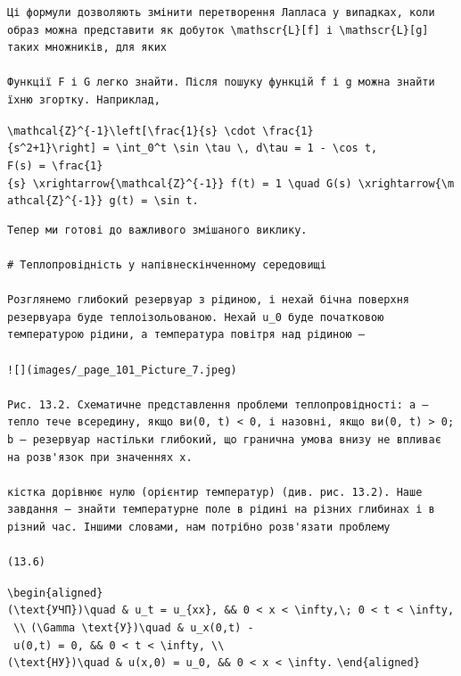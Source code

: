 \documentclass[
  ukrainian,
]{article}
\begin{document}
\begin{verbatim}
Ці формули дозволяють змінити перетворення Лапласа у випадках, коли образ можна представити як добуток \mathscr{L}[f] і \mathscr{L}[g] таких множників, для яких

Функції F і G легко знайти. Після пошуку функцій f і g можна знайти їхню згортку. Наприклад,
\end{verbatim}

\texttt{\textbackslash{}mathcal\{Z\}\^{}\{-1\}\textbackslash{}left{[}\textbackslash{}frac\{1\}\{s\}\ \textbackslash{}cdot\ \textbackslash{}frac\{1\}\{s\^{}2+1\}\textbackslash{}right{]}\ =\ \textbackslash{}int\_0\^{}t\ \textbackslash{}sin\ \textbackslash{}tau\ \textbackslash{},\ d\textbackslash{}tau\ =\ 1\ -\ \textbackslash{}cos\ t,}
\texttt{F(s)\ =\ \textbackslash{}frac\{1\}\{s\}\ \textbackslash{}xrightarrow\{\textbackslash{}mathcal\{Z\}\^{}\{-1\}\}\ f(t)\ =\ 1\ \textbackslash{}quad\ G(s)\ \textbackslash{}xrightarrow\{\textbackslash{}mathcal\{Z\}\^{}\{-1\}\}\ g(t)\ =\ \textbackslash{}sin\ t.}

\begin{verbatim}
Тепер ми готові до важливого змішаного виклику.

# Теплопровідність у напівнескінченному середовищі

Розглянемо глибокий резервуар з рідиною, і нехай бічна поверхня резервуара буде теплоізольованою. Нехай u_0 буде початковою температурою рідини, а температура повітря над рідиною —

![](images/_page_101_Picture_7.jpeg)

Рис. 13.2. Схематичне представлення проблеми теплопровідності: a — тепло тече всередину, якщо ви(0, t) < 0, і назовні, якщо ви(0, t) > 0; b — резервуар настільки глибокий, що гранична умова внизу не впливає на розв'язок при значеннях x.

кістка дорівнює нулю (орієнтир температур) (див. рис. 13.2). Наше завдання — знайти температурне поле в рідині на різних глибинах і в різний час. Іншими словами, нам потрібно розв'язати проблему

(13.6)
\end{verbatim}

\texttt{\textbackslash{}begin\{aligned\}}
\texttt{(\textbackslash{}text\{УЧП\})\textbackslash{}quad\ \&\ u\_t\ =\ u\_\{xx\},\ \&\&\ 0\ \textless{}\ x\ \textless{}\ \textbackslash{}infty,\textbackslash{};\ 0\ \textless{}\ t\ \textless{}\ \textbackslash{}infty,\ \textbackslash{}\textbackslash{}}
\texttt{(\textbackslash{}Gamma\ \textbackslash{}text\{У\})\textbackslash{}quad\ \&\ u\_x(0,t)\ -\ u(0,t)\ =\ 0,\ \&\&\ 0\ \textless{}\ t\ \textless{}\ \textbackslash{}infty,\ \textbackslash{}\textbackslash{}}
\texttt{(\textbackslash{}text\{НУ\})\textbackslash{}quad\ \&\ u(x,0)\ =\ u\_0,\ \&\&\ 0\ \textless{}\ x\ \textless{}\ \textbackslash{}infty.}
\texttt{\textbackslash{}end\{aligned\}}
\end{document}
